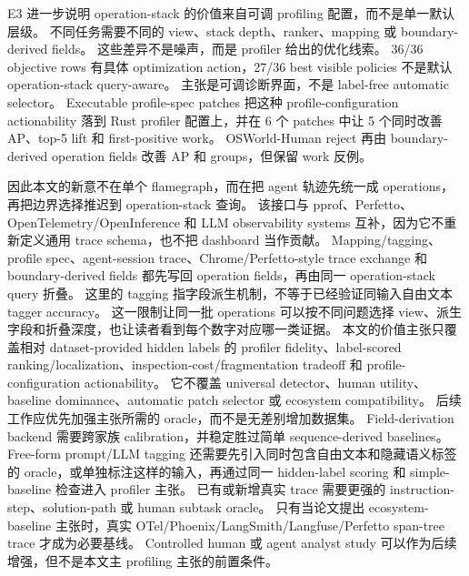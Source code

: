 \documentclass[10pt,twocolumn]{ctexart}
\begin{document}
E3 进一步说明 operation-stack 的价值来自可调 profiling 配置，而不是单一默认层级。
不同任务需要不同的 view、stack depth、ranker、mapping 或 boundary-derived fields。
这些差异不是噪声，而是 profiler 给出的优化线索。
36/36 objective rows 有具体 optimization action，27/36 best visible policies 不是默认 operation-stack query-aware。
主张是可调诊断界面，不是 label-free automatic selector。
Executable profile-spec patches 把这种 profile-configuration actionability 落到 Rust profiler 配置上，并在 6 个 patches 中让 5 个同时改善 AP、top-5 lift 和 first-positive work。
OSWorld-Human reject 再由 boundary-derived operation fields 改善 AP 和 groups，但保留 work 反例。

因此本文的新意不在单个 flamegraph，而在把 agent 轨迹先统一成 operations，再把边界选择推迟到 operation-stack 查询。
该接口与 pprof、Perfetto、OpenTelemetry/OpenInference 和 LLM observability systems 互补，因为它不重新定义通用 trace schema，也不把 dashboard 当作贡献。
Mapping/tagging、profile spec、agent-session trace、Chrome/Perfetto-style trace exchange 和 boundary-derived fields 都先写回 operation fields，再由同一 operation-stack query 折叠。
这里的 tagging 指字段派生机制，不等于已经验证同输入自由文本 tagger accuracy。
这一限制让同一批 operations 可以按不同问题选择 view、派生字段和折叠深度，也让读者看到每个数字对应哪一类证据。
本文的价值主张只覆盖相对 dataset-provided hidden labels 的 profiler fidelity、label-scored ranking/localization、inspection-cost/fragmentation tradeoff 和 profile-configuration actionability。
它不覆盖 universal detector、human utility、baseline dominance、automatic patch selector 或 ecosystem compatibility。
后续工作应优先加强主张所需的 oracle，而不是无差别增加数据集。
Field-derivation backend 需要跨家族 calibration，并稳定胜过简单 sequence-derived baselines。
Free-form prompt/LLM tagging 还需要先引入同时包含自由文本和隐藏语义标签的 oracle，或单独标注这样的输入，再通过同一 hidden-label scoring 和 simple-baseline 检查进入 profiler 主张。
已有或新增真实 trace 需要更强的 instruction-step、solution-path 或 human subtask oracle。
只有当论文提出 ecosystem-baseline 主张时，真实 OTel/Phoenix/LangSmith/Langfuse/Perfetto span-tree trace 才成为必要基线。
Controlled human 或 agent analyst study 可以作为后续增强，但不是本文主 profiling 主张的前置条件。

\vspace{-0.8em}
\end{document}
